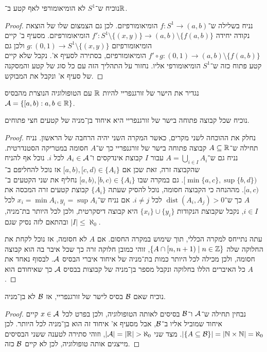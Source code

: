 \subquestion{}
נוכיח ש־$S^1$ לא הומיאומורפי לאף קטע ב־$\mathbb{R}$.
\begin{proof}
	נניח בשלילה ש־$f : S^1 \to (a, b)$ הומיאומורפיזם.
	לכן גם הצמצום שלו של הוצאת נקודה יחידה $f' : S^1 \setminus \{ (x, y) \} \to (a, b) \setminus \{ f(a, b) \}$ הומיאומורפיזם.
	מסעיף ב' קיים הומיאומורפיזם $g : (0, 1) \to S^1 \setminus \{ (x, y) \}$ ולכן גם $f' \circ g : (0, 1) \to (a, b) \setminus \{ f(a, b) \}$ הומיאומורפיזם, בסתירה לסעיף א'.
	נקבל שלא קיים קטע פתוח כזה ש־$S^1$ הומיאומורפי אליו.
	נחזור על התהליך הזה עם כל סוג של קטע והמסקנה של סעיף א' ונקבל את המבוקש.
\end{proof}

\question{}
נגדיר את הישר של זורגנפריי להיות $\mathbb{R}$ עם הטופולוגיה הנוצרת מהבסיס $\mathcal{A} = \{ [a, b) : a, b \in \mathbb{R} \}$.

\subquestion{}
נוכיח שכל קבוצה פתוחה בישר של זורגנפריי היא איחוד בן־מניה של קטעים חצי פתוחים.
\begin{proof}
	נחלק את ההוכחה לשני מקרים, כאשר המקרה השני יהיה הרחבה של הראשון.
	נניח תחילה ש־$A \subseteq \mathbb{R}$ קבוצה פתוחה בישר של זורגנפריי כך ש־$A$ חסומה במטריקה הסטנדרטית.
	נניח גם ש־$A = \bigcup_{i \in I} A_i$ עבור $I$ קבוצת אינדקסים ו־$A_i \in \mathcal{A}$ לכל $i$.
	נוכל אף להניח שהקבוצה זרה, זאת שכן אם $[a, b), [c, d) \in \{ A_i \}$ אז נוכל להחליפם ב־$[\min\{a, c\}, \sup\{b, d\})$.
	גם במקרה שבו $[a, b), [b, c) \in \{ A_i \}$ נחליף את שני הקטעים ב־$[a, c)$.
	מההנחה כי הקבוצה חסומה, נוכל להסיק שעתה $\{ A_i \}$ קבוצת קטעים זרה המכסה את $A$ כך ש־$\operatorname{dist}(A_i, A_j) > 0$ לכל $i \ne j$.
	אם נניח ש־$x_i = \min A_i, y_i = \sup A_i$ לכל $i \in I$, נקבל שקבוצת הנקודות $\{ x_i \} \cup \{ y_i \}$ היא קבוצה דיסקרטית, ולכן לכל היותר בת־מניה, ובהתאם לזה נסיק שגם $|I| \le \aleph_0$.

	עתה נתייחס למקרה הכללי, תוך שימוש במקרה החסום.
	אם $A$ לא חסומה, אז נוכל לקחת את החלוקה שלה $\{ A \cap [n, n + 1) \mid n \in \mathbb{Z} \}$, זוהי כמובן חלוקה זרה כך שכל איבר בה הוא קבוצה חסומה, ולכן מכילה לכל היותר כמות בת־מניה של איחוד איברי הבסיס $\mathcal{A}$.
	לבסוף נאחד את כל האיברים הללו בחלוקה ונקבל מספר בן־מניה של קבוצות בבסיס $\mathcal{A}$ כך שאיחודם הוא $A$.
\end{proof}

\subquestion{}
נוכיח שאם $\mathcal{B}$ בסיס לישר של זורגנפריי, אז $\mathcal{B}$ לא בן־מניה.
\begin{proof}
	נבחין תחילה ש־$\mathcal{A}$ ו־$\mathcal{B}$ בסיסים לאותה הטופולוגיה, ולכן בפרט לכל $x \in \mathcal{A}$ קיים איחוד שמוביל אליו ב־$\mathcal{B}$, אבל מסעיף א' איחוד זה הוא בן־מניה לכל היותר.
	לכן $|\{ A \subseteq \mathcal{B} \}| = |\mathbb{N} \times \mathbb{N}| = \aleph_0$.
	מצד שני $|\mathcal{A}| = |\mathbb{R}| > \aleph_0$, וזוהי סתירה לטענה ששני הבסיסים מייצגים אותה טופולוגיה, לכן לא קיים $\mathcal{B}$ כזה.
\end{proof}

